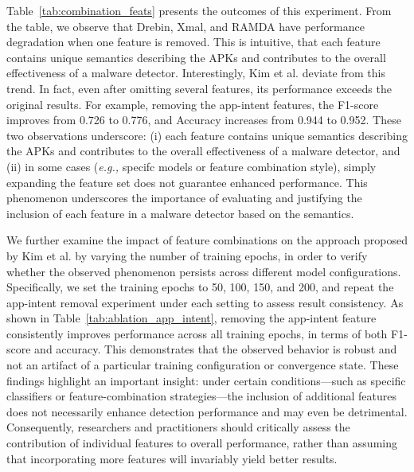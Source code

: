 Table~\ref{tab:combination_feats} presents the outcomes of this experiment.
From the table, we observe that Drebin, Xmal, and RAMDA have performance degradation when one feature is removed.
This is intuitive, that each feature contains unique semantics describing the APKs and contributes to the overall effectiveness of a malware detector.
Interestingly, Kim et al. deviate from this trend.
In fact, even after omitting several features, its performance exceeds the original results.
For example, removing the app-intent features, the F1-score improves from 0.726 to 0.776, and Accuracy increases from 0.944 to 0.952.
These two observations underscore:
(i) each feature contains unique semantics describing the APKs and contributes to the overall effectiveness of a malware detector, and 
(ii) in some cases (\textit{e.g.,} specifc models or feature combination style), simply expanding the feature set does not guarantee enhanced performance.
This phenomenon underscores the importance of evaluating and justifying the inclusion of each feature in a malware detector based on the semantics.

We further examine the impact of feature combinations on the approach proposed by Kim et al. by varying the number of training epochs, in order to verify whether the observed phenomenon persists across different model configurations. Specifically, we set the training epochs to 50, 100, 150, and 200, and repeat the app-intent removal experiment under each setting to assess result consistency.
As shown in Table~\ref{tab:ablation_app_intent}, removing the app-intent feature consistently improves performance across all training epochs, in terms of both F1-score and accuracy. This demonstrates that the observed behavior is robust and not an artifact of a particular training configuration or convergence state.
These findings highlight an important insight: under certain conditions—such as specific classifiers or feature-combination strategies—the inclusion of additional features does not necessarily enhance detection performance and may even be detrimental. Consequently, researchers and practitioners should critically assess the contribution of individual features to overall performance, rather than assuming that incorporating more features will invariably yield better results.

